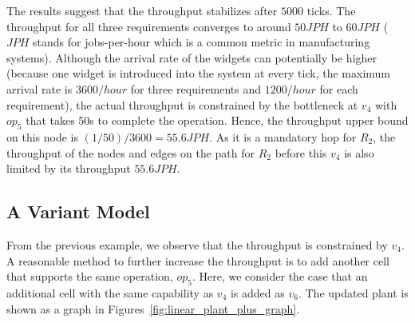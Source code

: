 The results suggest that the throughput stabilizes after $5000$ ticks.
The throughput for all three requirements converges to around $50 JPH$ to $60 JPH$ ($JPH$ stands for jobs-per-hour which is a common metric in manufacturing systems). 
Although the arrival rate of the widgets can potentially be higher (because one widget is introduced into the system at every tick, the maximum arrival rate is $3600/hour$ for three requirements and $1200/hour$ for each requirement),
the actual throughput is constrained by the bottleneck at $v_4$ with $op_5$ that takes 50s to complete the operation.
Hence, the throughput upper bound on this node is $(1/50)/3600=55.6JPH$.
As it is a mandatory hop for $R_2$, the throughput of the nodes and edges on the path for $R_2$ before this $v_4$ is also limited by its throughput $55.6JPH$.



\subsection{A Variant Model}
From the previous example, we observe that the throughput is constrained by $v_4$.
A reasonable method to further increase the throughput is to add another cell that supports the same operation, $op_5$.
Here, we consider the case that an additional cell with the same capability as $v_4$ is added as $v_6$.
The updated plant is shown as a graph in Figures~\ref{fig:linear_plant_plus_graph}.


